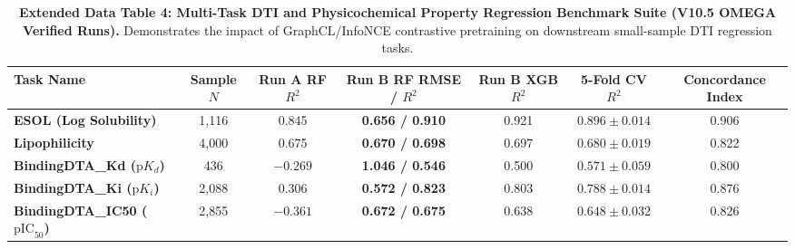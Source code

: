 \begin{table}[h!]
\caption{\textbf{Extended Data Table 4: Multi-Task DTI and Physicochemical Property Regression Benchmark Suite (V10.5 OMEGA Verified Runs).} Demonstrates the impact of GraphCL/InfoNCE contrastive pretraining on downstream small-sample DTI regression tasks.}
\label{tab:ed_regression}
\centering
\small
\begin{tabular}{lcccccc}
\toprule
\textbf{Task Name} & \textbf{Sample $N$} & \textbf{Run A RF $R^2$} & \textbf{Run B RF RMSE / $R^2$} & \textbf{Run B XGB $R^2$} & \textbf{5-Fold CV $R^2$} & \textbf{Concordance Index} \\
\midrule
\textbf{ESOL (Log Solubility)} & 1,116 & 0.845 & \textbf{0.656 / 0.910} & 0.921 & $0.896 \pm 0.014$ & 0.906 \\
\textbf{Lipophilicity} & 4,000 & 0.675 & \textbf{0.670 / 0.698} & 0.697 & $0.680 \pm 0.019$ & 0.822 \\
\textbf{BindingDTA\_Kd ($\text{p}K_d$)} & 436 & $-0.269$ & \textbf{1.046 / 0.546} & 0.500 & $0.571 \pm 0.059$ & 0.800 \\
\textbf{BindingDTA\_Ki ($\text{p}K_i$)} & 2,088 & 0.306 & \textbf{0.572 / 0.823} & 0.803 & $0.788 \pm 0.014$ & 0.876 \\
\textbf{BindingDTA\_IC50 ($\text{pIC}_{50}$)} & 2,855 & $-0.361$ & \textbf{0.672 / 0.675} & 0.638 & $0.648 \pm 0.032$ & 0.826 \\
\bottomrule
\end{tabular}
\end{table}

\vspace{1em}

